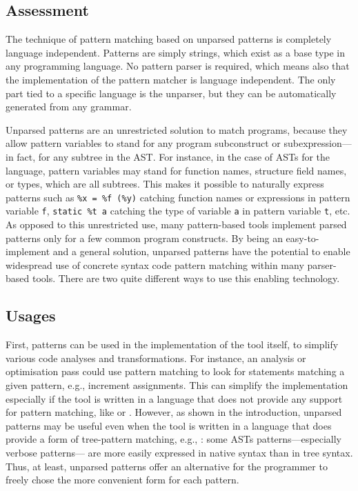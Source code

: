 \subsection{Assessment}

The technique of pattern matching based on unparsed patterns is
completely language independent. Patterns are simply strings, which
exist as a base type in any programming language. No pattern parser is
required, which means also that the implementation of the pattern
matcher is language independent. The only part tied to a specific
language is the unparser, but they can be automatically generated from
any grammar. 

Unparsed patterns are an unrestricted solution to match programs,
because they allow pattern variables to stand for any program
sub\-construct or sub\-expression---in fact, for any subtree in the
AST.  For instance, in the case of ASTs for the \Clang language,
pattern variables may stand for function names, structure field names,
or types, which are all subtrees. This makes it possible to naturally
express patterns such as \texttt{\%x = \%f (\%y)} catching function
names or expressions in pattern variable \texttt{f}, \texttt{static
  \%t a} catching the type of variable \texttt{a} in pattern variable
\texttt{t}, etc. As opposed to this unrestricted use, many
pattern\hyp{}based tools implement parsed patterns only for a few
common program constructs. By being an easy\hyp{}to\hyp{}implement and
a general solution, unparsed patterns have the potential to enable
widespread use of concrete syntax code pattern matching within many
parser\hyp{}based tools. There are two quite different ways to use
this enabling technology.

\subsection{Usages}

First, patterns can be used in the implementation of the tool itself,
to simplify various code analyses and transformations. For instance,
an analysis or optimisation pass could use pattern matching to look
for statements matching a given pattern, e.g., increment assignments.
This can simplify the implementation especially if the tool is written
in a language that does not provide any support for pattern matching,
like \Clang or \Java. However, as shown in the introduction, unparsed
patterns may be useful even when the tool is written in a language
that does provide a form of tree\hyp{}pattern matching, e.g., \ML:
some ASTs patterns---especially verbose patterns--- are more easily
expressed in native syntax than in tree syntax. Thus, at least,
unparsed patterns offer an alternative for the programmer to freely
chose the more convenient form for each pattern.

